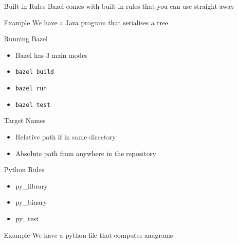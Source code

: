 \documentclass[aspectratio=169]{beamer}
\begin{document}
\begin{body-slide}{Built-in Rules}
Bazel comes with built-in rules that you can use straight away

\end{body-slide}

\begin{body-slide}{Example}
We have a Java program that serialises a tree
\end{body-slide}

\begin{body-slide}{Running Bazel}
\begin{itemize}[<+-|alert@+>] 
    \color{UQCSBlue}
    \item Bazel has 3 main modes
    \item \texttt{bazel build}
    \item \texttt{bazel run}
    \item \texttt{bazel test}
\end{itemize}
\end{body-slide}

\begin{body-slide}{Target Names}
\begin{itemize}[<+-|alert@+>] 
    \color{UQCSBlue}
    \item Relative path if in same directory
    \item Absolute path from anywhere in the repository
\end{itemize}
\end{body-slide}

\begin{body-slide}{Python Rules}
\begin{itemize}
    \item py\_library
    \item py\_binary
    \item py\_test
\end{itemize}
\end{body-slide}

\begin{body-slide}{Example}
We have a python file that computes anagrams
\end{body-slide}
\end{document}
